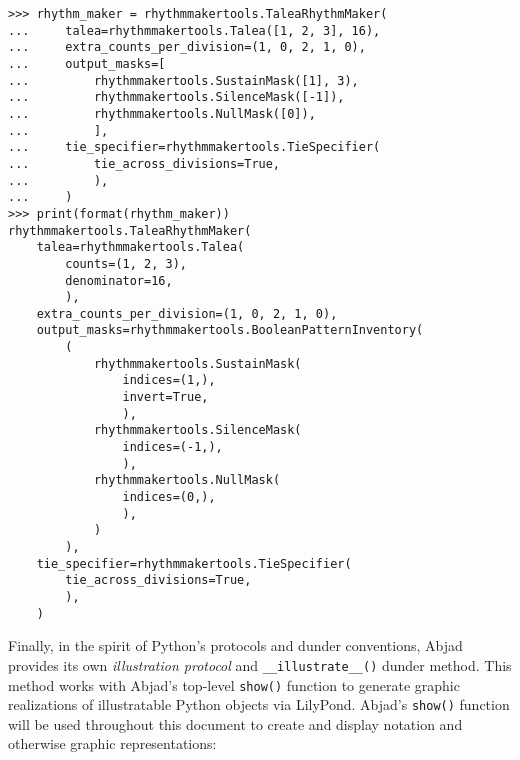 \begin{comment}
<abjad>
rhythm_maker = rhythmmakertools.TaleaRhythmMaker(
    talea=rhythmmakertools.Talea([1, 2, 3], 16),
    extra_counts_per_division=(1, 0, 2, 1, 0),
    output_masks=[
        rhythmmakertools.SustainMask([1], 3),
        rhythmmakertools.SilenceMask([-1]),
        rhythmmakertools.NullMask([0]),
        ],
    tie_specifier=rhythmmakertools.TieSpecifier(
        tie_across_divisions=True,
        ),
    )
print(format(rhythm_maker))
</abjad>
\end{comment}

\begin{abjadbookoutput}
\begin{singlespacing}
\vspace{-0.5\baselineskip}
\begin{verbatim}
>>> rhythm_maker = rhythmmakertools.TaleaRhythmMaker(
...     talea=rhythmmakertools.Talea([1, 2, 3], 16),
...     extra_counts_per_division=(1, 0, 2, 1, 0),
...     output_masks=[
...         rhythmmakertools.SustainMask([1], 3),
...         rhythmmakertools.SilenceMask([-1]),
...         rhythmmakertools.NullMask([0]),
...         ],
...     tie_specifier=rhythmmakertools.TieSpecifier(
...         tie_across_divisions=True,
...         ),
...     )
>>> print(format(rhythm_maker))
rhythmmakertools.TaleaRhythmMaker(
    talea=rhythmmakertools.Talea(
        counts=(1, 2, 3),
        denominator=16,
        ),
    extra_counts_per_division=(1, 0, 2, 1, 0),
    output_masks=rhythmmakertools.BooleanPatternInventory(
        (
            rhythmmakertools.SustainMask(
                indices=(1,),
                invert=True,
                ),
            rhythmmakertools.SilenceMask(
                indices=(-1,),
                ),
            rhythmmakertools.NullMask(
                indices=(0,),
                ),
            )
        ),
    tie_specifier=rhythmmakertools.TieSpecifier(
        tie_across_divisions=True,
        ),
    )
\end{verbatim}
\end{singlespacing}
\end{abjadbookoutput}

\noindent Finally, in the spirit of Python's protocols and dunder conventions,
Abjad provides its own \emph{illustration protocol} and
\texttt{\_\_illustrate\_\_()} dunder method. This method works with Abjad's
top-level \texttt{show()} function to generate graphic realizations of
illustratable Python objects via LilyPond. Abjad's \texttt{show()} function
will be used throughout this document to create and display notation and
otherwise graphic representations:

